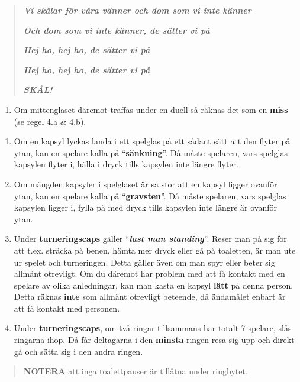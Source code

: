 \begin{quote}
\emph{\textbf{Vi skålar för våra vänner och dom som vi inte
känner}}

\emph{\textbf{Och dom som vi inte känner, de sätter vi på}}

\emph{\textbf{Hej ho, hej ho, de sätter vi på}}

\emph{\textbf{Hej ho, hej ho, de sätter vi på}}

\textbf{\emph{SKÅL!}}
\end{quote}

\begin{enumerate}
\def\labelenumi{\alph{enumi}.}
\item
  Om mittenglaset däremot träffas under en duell så räknas det som en
  \textbf{miss} (se regel 4.a \& 4.b).
\end{enumerate}

\begin{enumerate}
\def\labelenumi{\arabic{enumi}.}
\setcounter{enumi}{5}
\item
  Om en kapsyl lyckas landa i ett spelglas på ett sådant sätt att den
  flyter på ytan, kan en spelare kalla på ``\textbf{sänkning}''. Då
  måste spelaren, vars spelglas kapsylen flyter i, hälla i dryck tills
  kapsylen inte längre flyter.
\item
  Om mängden kapsyler i spelglaset är så stor att en kapsyl ligger
  ovanför ytan, kan en spelare kalla på ``\textbf{gravsten}''. Då måste
  spelaren, vars spelglas kapsylen ligger i, fylla på med dryck tills
  kapsylen inte längre är ovanför ytan.
\item
  Under \textbf{turneringscaps} gäller ``\emph{\textbf{last man
  standing}}''. Reser man på sig för att t.ex. sträcka på benen, hämta
  mer dryck eller gå på toaletten, är man ute ur spelet och turneringen.
  Detta gäller även om man spyr eller beter sig allmänt otrevligt. Om du
  däremot har problem med att få kontakt med en spelare av olika
  anledningar, kan man kasta en kapsyl \textbf{lätt} på denna person.
  Detta räknas \textbf{inte} som allmänt otrevligt beteende, då
  ändamålet enbart är att få kontakt med personen.
\item
  Under \textbf{turneringscaps}, om två ringar tillsammans har totalt 7
  spelare, slås ringarna ihop. Då får deltagarna i den \textbf{minsta}
  ringen resa sig upp och direkt gå och sätta sig i den andra ringen.
\end{enumerate}

\begin{quote}
\textbf{NOTERA} att inga toalettpauser är tillåtna under ringbytet.
\end{quote}

